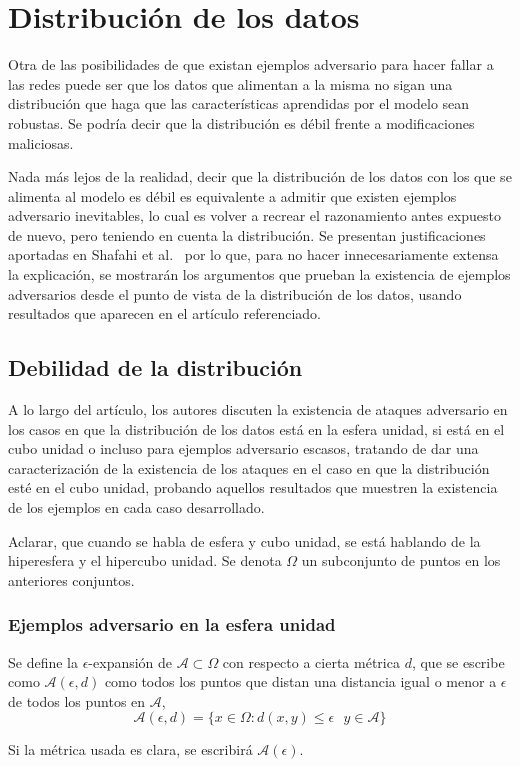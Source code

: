 \section{Distribución de los datos}

Otra de las posibilidades de que existan ejemplos adversario para hacer fallar a las redes puede ser que los datos que alimentan a la misma no sigan una distribución que haga que las características aprendidas por el modelo sean robustas. Se podría decir que la distribución es débil frente a modificaciones maliciosas.

Nada más lejos de la realidad, decir que la distribución de los datos con los que se alimenta al modelo es débil es equivalente a admitir que existen ejemplos adversario inevitables, lo cual es volver a recrear el razonamiento antes expuesto de nuevo, pero teniendo en cuenta la distribución. Se presentan justificaciones aportadas en Shafahi et al.~\cite{ShafahiDebilDist} por lo que, para no hacer innecesariamente extensa la explicación, se mostrarán los argumentos que prueban la existencia de ejemplos adversarios desde el punto de vista de la distribución de los datos, usando resultados que aparecen en el artículo referenciado.

\subsection{Debilidad de la distribución}

A lo largo del artículo, los autores discuten la existencia de ataques adversario en los casos en que la distribución de los datos está en la esfera unidad, si está en el cubo unidad o incluso para ejemplos adversario escasos, tratando de dar una caracterización de la existencia de los ataques en el caso en que la distribución esté en el cubo unidad, probando aquellos resultados que muestren la existencia de los ejemplos en cada caso desarrollado.

Aclarar, que cuando se habla de esfera y cubo unidad, se está hablando de la hiperesfera y el hipercubo unidad. Se denota $\Omega$ un subconjunto de puntos en los anteriores conjuntos.

\subsubsection{Ejemplos adversario en la esfera unidad}

\begin{definicion}
Se define la $\epsilon$-expansión de $\mathcal{A} \subset \Omega$ con respecto a cierta métrica $d$, que se escribe como $\mathcal{A}(\epsilon,d)$ como todos los puntos que distan una distancia igual o menor a $\epsilon$ de todos los puntos en $\mathcal{A}$,
$$\mathcal{A}(\epsilon,d)=\{x \in \Omega : d(x,y) \leq \epsilon \text{ } y \in \mathcal{A} \}$$

Si la métrica usada es clara, se escribirá $\mathcal{A}(\epsilon)$.
\end{definicion}


